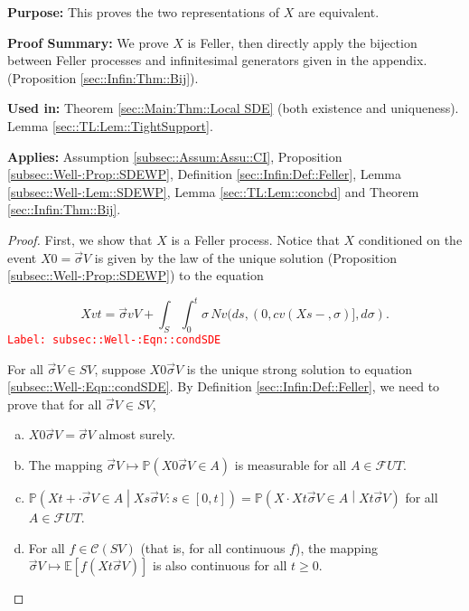 \documentclass[12pt]{article}
\newcommand{\mb}{\mathbb}
\newcommand{\mc}{\mathcal}
\newcommand{\tr}{\textcolor{red}}
\newcommand{\labe}[1]{\tr{\texttt{Label: #1}}}
\newcommand{\purpose}{\textbf{Purpose: }}
\newcommand{\pfsum}{\textbf{Proof Summary: }}
\newcommand{\usein}{\textbf{Used in: }}
\newcommand{\app}{\textbf{Applies: }}
\newcommand{\pr}{\mb{P}}							%
\newcommand{\ex}[1]{\mb{E}\left[#1\right]}			%
\renewcommand{\v}{v}							%
\renewcommand{\U}{U}							%
\renewcommand{\S}{S}							%
\newcommand{\s}{\sigma}							%
\newcommand{\sv}{\vec{\s}}						%
\newcommand{\T}{T}								%
\renewcommand{\t}{t}							%
\renewcommand{\tt}{s}							%
\newcommand{\F}{\mc{F}}							%
\newcommand{\X}{X}								%
\newcommand{\IGr}{c}							%
\newcommand{\cont}{\mc{C}}						%
\newcommand{\poiss}{N}							%
\begin{document}
\purpose This proves the two representations of \(\X{}{}\) are equivalent.

\pfsum We prove \(\X{}{}\) is Feller, then directly apply the bijection between Feller processes and infinitesimal generators given in the appendix. (Proposition \ref{sec::Infin:Thm::Bij}).

\usein Theorem \ref{sec::Main:Thm::Local SDE} (both existence and uniqueness). Lemma \ref{sec::TL:Lem::TightSupport}.

\app Assumption \ref{subsec::Assum:Assu::CI}, Proposition \ref{subsec::Well-:Prop::SDEWP}, Definition \ref{sec::Infin:Def::Feller}, Lemma \ref{subsec::Well-:Lem::SDEWP}, Lemma \ref{sec::TL:Lem::concbd} and Theorem \ref{sec::Infin:Thm::Bij}.

\begin{proof}
First, we show that \(\X{}{}\) is a Feller process. Notice that \(\X{}{}\) conditioned on the event \(\X{}{0} = \sv{}{V}\) is given by the law of the unique solution (Proposition \ref{subsec::Well-:Prop::SDEWP}) to the equation

\begin{equation}
\X{\v}{\t} = \sv{\v}{V} + \int_\S\int_0^\t \s\,\poiss{\v}(d\tt,(0,\IGr{\v}(\X{}{\tt-},\s)],d\s).
\label{subsec::Well-:Eqn::condSDE}
\end{equation}
\labe{subsec::Well-:Eqn::condSDE}

For all \(\sv{}{V}\in\S{V}\), suppose \(\X{}{0}{\sv{}{V}}\) is the unique strong solution to equation \eqref{subsec::Well-:Eqn::condSDE}. By Definition \ref{sec::Infin:Def::Feller}, we need to prove that for all \(\sv{}{V}\in \S{V}\),

\begin{enumerate}[(a)]
\item \(\X{}{0}{\sv{}{V}} = \sv{}{V}\) almost surely.

\item The mapping \(\sv{}{V}\mapsto \pr\left(\X{}{0}{\sv{}{V}}\in A\right)\) is measurable for all \(A\in \F{\U}{\T}\).

\item \(\pr\left(\X{}{\t+\cdot}{\sv{}{V}}\in A\middle|\X{}{\tt}{\sv{}{V}}:\tt \in [0,\t]\right) = \pr\left(\X{}{\cdot}{\X{}{\t}{\sv{}{V}}} \in A\middle| \X{}{\t}{\sv{}{V}} \right)\) for all \(A \in \F{\U}{\T}\).

\item For all \(f \in \cont(\S{V})\) (that is, for all continuous \(f\)), the mapping \(\sv{}{V}\mapsto \ex{f(\X{}{\t}{\sv{}{V}})}\) is also continuous for all \(\t\geq 0\).
\end{enumerate}


\end{proof}
\end{document}

